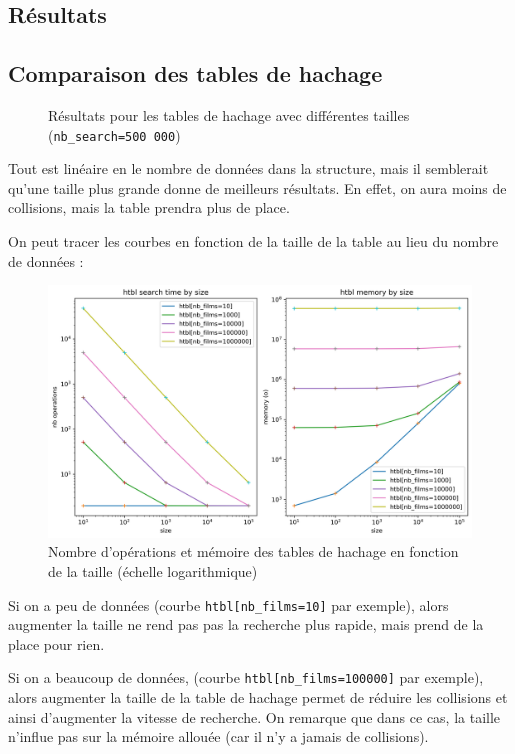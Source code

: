 \documentclass[a4paper, 12pt, twoside]{article}
\begin{document}
\begin{indt}{\section{Résultats}}
\begin{indt}{\subsection{Comparaison des tables de hachage}}
\begin{figure}[H]
                \caption{Résultats pour les tables de hachage avec différentes tailles (\texttt{nb\_search=500 000})}
                \label{fig:htbl}
            \end{figure}

            Tout est linéaire en le nombre de données dans la structure, mais il semblerait qu'une taille plus grande donne de meilleurs résultats.
            En effet, on aura moins de collisions, mais la table prendra plus de place.

            On peut tracer les courbes en fonction de la taille de la table au lieu du nombre de données :

            \begin{figure}[H]
                \centering
            
                \includegraphics[width=1.0\textwidth]{../plots/nb_search_500_000/htbl_size.png}
            
                \caption{Nombre d'opérations et mémoire des tables de hachage en fonction de la taille (échelle logarithmique)}
                \label{fig:htbl_size}
            \end{figure}

            Si on a peu de données (courbe \texttt{htbl[nb\_films=10]} par exemple), alors augmenter la taille ne rend pas pas la recherche plus rapide, mais prend de la place pour rien.

            Si on a beaucoup de données, (courbe \texttt{htbl[nb\_films=100000]} par exemple), alors augmenter la taille de la table de hachage permet de réduire les collisions et ainsi d'augmenter la vitesse de recherche.
            On remarque que dans ce cas, la taille n'influe pas sur la mémoire allouée (car il n'y a jamais de collisions).
        \end{indt} %
    \end{indt} %
    
\end{document}
